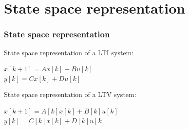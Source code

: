 \section{State space representation}
\begin{frame}
	\frametitle{State space representation}
	\begin{definition}
		State space representation of a LTI system:
		\begin{center}
			$x[k+1] = A x[k] + B u[k]$ \\
			$y[k] = C x[k] + D u[k] $ \\
		\end{center}
			State space representation of a LTV system:
			\begin{center}
				$x[k+1] = A[k] x[k] + B[k] u[k]$ \\
				$y[k] = C[k] x[k] + D[k] u[k] $ \\
			\end{center}
	\end{definition}
\end{frame}

